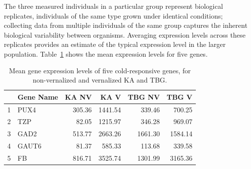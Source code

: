 The three measured individuals in a particular group represent biological replicates, individuals of the same type grown under identical conditions; collecting data from multiple individuals of the same group captures the inherent biological variability between organisms. Averaging expression levels across these replicates provides an estimate of the typical expression level in the larger population. Table~\ref{sampleArenosaMeans} shows the mean expression levels for five genes. 

\begin{table}[h!]
	\centering
	\begin{tabular}{rlrrrr}
		\hline
		& Gene Name & KA NV & KA V & TBG NV & TBG V \\ 
		\hline
		1 & PUX4 & 305.36 & 1441.54 & 339.46 & 700.25 \\ 
		2 & TZP & 82.05 & 1215.97 & 346.28 & 969.07 \\ 
		3 & GAD2 & 513.77 & 2663.26 & 1661.30 & 1584.14 \\ 
		4 & GAUT6 & 81.37 & 585.33 & 113.68 & 339.58 \\ 
		5 & FB & 816.71 & 3525.74 & 1301.99 & 3165.36 \\ 
		\hline
	\end{tabular}
	\caption{Mean gene expression levels of five cold-responsive genes, for non-vernalized and vernalized KA and TBG.} 
	\label{sampleArenosaMeans}
\end{table}


